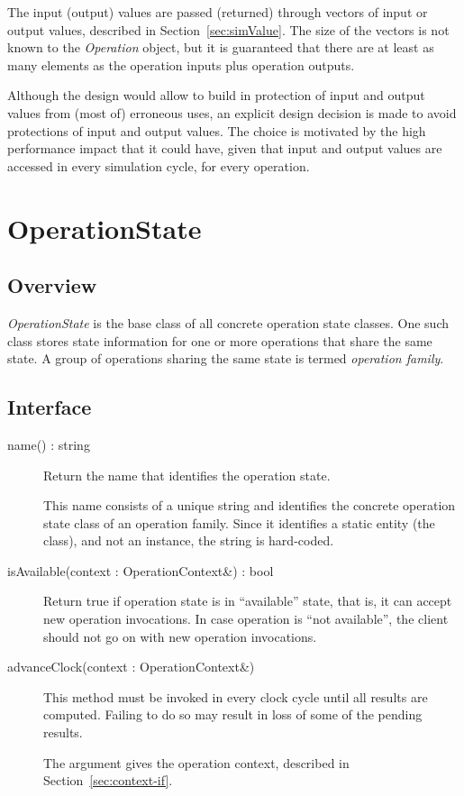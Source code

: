 \documentclass[a4paper,twoside]{tce}
\begin{document}
The input (output) values are passed (returned) through vectors of input or
output values, described in Section~\ref{sec:simValue}.  The size of the
vectors is not known to the \emph{Operation} object, but it is guaranteed
that there are at least as many elements as the operation inputs plus
operation outputs.

Although the design would allow to build in protection of input and output
values from (most of) erroneous uses, an explicit design decision is made to
avoid protections of input and output values.  The choice is motivated by
the high performance impact that it could have, given that input and output
values are accessed in every simulation cycle, for every operation.

\section{OperationState}
\label{sec:operationState}

\subsection{Overview}

\emph{OperationState} is the base class of all concrete operation state
classes.  One such class stores state information for one or more operations
that share the same state.  A group of operations sharing the same state is
termed \emph{operation family}.

\subsection{Interface}

\begin{description}
\item[name() : string] %

  Return the name that identifies the operation state.

  This name consists of a unique string and identifies the concrete
  operation state class of an operation family. Since it identifies a static
  entity (the class), and not an instance, the string is hard-coded.

\item[isAvailable(context : OperationContext\&) : bool] %

  Return true if operation state is in ``available'' state, that is, it can
  accept new operation invocations. In case operation is ``not available'',
  the client should not go on with new operation invocations.

\item[advanceClock(context : OperationContext\&)] %

  This method must be invoked in every clock cycle until all results are
  computed. Failing to do so may result in loss of some of the pending
  results.

  The argument gives the operation context, described in
  Section~\ref{sec:context-if}.


\end{description}
\end{document}
